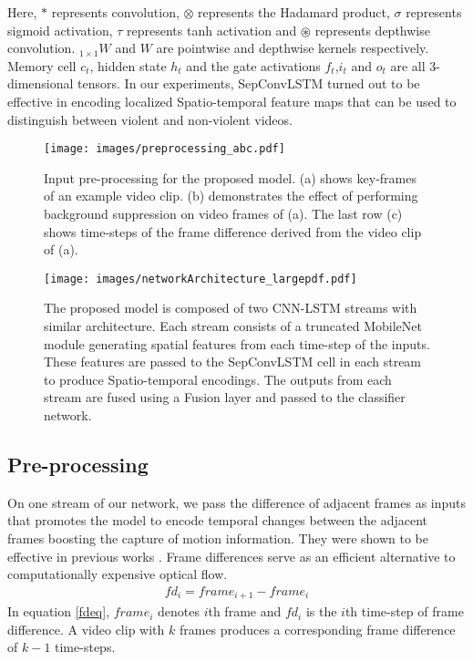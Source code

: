 \documentclass[conference]{IEEEtran}
\begin{document}
Here, \(*\) represents convolution, \(\otimes\) represents the Hadamard product, \(\sigma\) represents sigmoid activation, \(\tau\) represents tanh activation and \(\circledast\) represents depthwise convolution. \({}_{1\times1}W\) and \(W\) are pointwise and depthwise kernels respectively. Memory cell \(c_t\), hidden state \(h_t\) and the gate activations \(f_t\),\(i_t\) and \(o_t\) are all 3-dimensional tensors.
In our experiments, SepConvLSTM turned out to be effective in encoding localized Spatio-temporal feature maps that can be used to distinguish between violent and non-violent videos.




\begin{figure}[t]
\centering
\texttt{[image: images/preprocessing\_abc.pdf]}
\caption{Input pre-processing for the proposed model. (a) shows key-frames of an example video clip. (b) demonstrates the effect of performing background suppression on video frames of (a). The last row (c) shows time-steps of the frame difference derived from the video clip of (a). }
\label{fig:preprocessing}
\end{figure}

\begin{figure*}[t] 
\centering
\texttt{[image: images/networkArchitecture\_largepdf.pdf]}   \caption{The proposed model is composed of two CNN-LSTM streams with similar architecture. Each stream consists of a truncated MobileNet module generating spatial features from each time-step of the inputs. These features are passed to the SepConvLSTM cell in each stream to produce Spatio-temporal encodings. The outputs from each stream are fused using a Fusion layer and passed to the classifier network. }
\label{fig:architecture}
\end{figure*}



\subsection{Pre-processing}
On one stream of our network, we pass the difference of adjacent frames as inputs that promotes the model to encode temporal changes between the adjacent frames boosting the capture of motion information. They were shown to be effective in previous works \cite{sudhakaran2017learning, hanson2018bidirectional}. Frame differences serve as an efficient alternative to computationally expensive optical flow.
\begin{equation}
\label{fdeq}
\begin{split}
fd_{i} = frame_{i+1} - frame_{i}
\end{split}
\end{equation}
In equation \ref{fdeq}, \(frame_i\) denotes \(i\)th frame and \(fd_i\) is the \(i\)th time-step of frame difference. A video clip with \(k\) frames produces a corresponding frame difference of  \(k-1\) time-steps.
\end{document}
